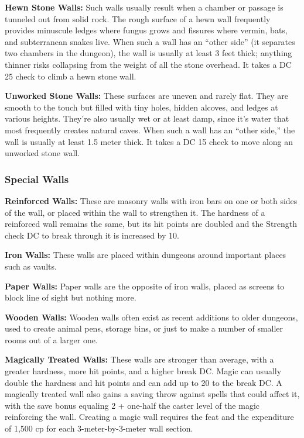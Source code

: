 \textbf{Hewn Stone Walls:} Such walls usually result when a chamber or passage is tunneled out from solid rock. The rough surface of a hewn wall frequently provides minuscule ledges where fungus grows and fissures where vermin, bats, and subterranean snakes live. When such a wall has an ``other side'' (it separates two chambers in the dungeon), the wall is usually at least 3 feet thick; anything thinner risks collapsing from the weight of all the stone overhead. It takes a DC 25  check to climb a hewn stone wall.

\textbf{Unworked Stone Walls:} These surfaces are uneven and rarely flat. They are smooth to the touch but filled with tiny holes, hidden alcoves, and ledges at various heights. They're also usually wet or at least damp, since it's water that most frequently creates natural caves. When such a wall has an ``other side,'' the wall is usually at least 1.5 meter thick. It takes a DC 15  check to move along an unworked stone wall.


\subsubsection{Special Walls}
\textbf{Reinforced Walls:} These are masonry walls with iron bars on one or both sides of the wall, or placed within the wall to strengthen it. The hardness of a reinforced wall remains the same, but its hit points are doubled and the Strength check DC to break through it is increased by 10.

\textbf{Iron Walls:} These walls are placed within dungeons around important places such as vaults.

\textbf{Paper Walls:} Paper walls are the opposite of iron walls, placed as screens to block line of sight but nothing more.

\textbf{Wooden Walls:} Wooden walls often exist as recent additions to older dungeons, used to create animal pens, storage bins, or just to make a number of smaller rooms out of a larger one.

\textbf{Magically Treated Walls:} These walls are stronger than average, with a greater hardness, more hit points, and a higher break DC. Magic can usually double the hardness and hit points and can add up to 20 to the break DC. A magically treated wall also gains a saving throw against spells that could affect it, with the save bonus equaling 2 + one-half the caster level of the magic reinforcing the wall. Creating a magic wall requires the  feat and the expenditure of 1,500 cp for each 3-meter-by-3-meter wall section.

